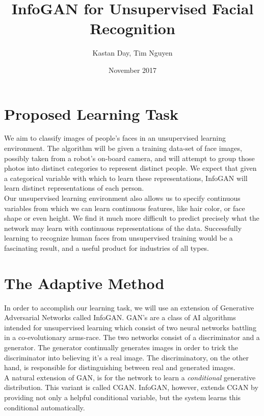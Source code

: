 \documentclass{article}
\title{InfoGAN for Unsupervised Facial Recognition}
\author{Kastan Day, Tim Nguyen}
\date{November 2017}
\begin{document}
\maketitle

\section{Proposed Learning Task}

We aim to classify images of people's faces in an unsupervised learning environment.  The algorithm will be given a training data-set of face images, possibly taken from a robot's on-board camera, and will attempt to group those photos into distinct categories to represent distinct people.  We expect that given a categorical variable with which to learn these representations, InfoGAN will learn distinct representations of each person. \\

Our unsupervised learning environment also allows us to specify continuous variables from which we can learn continuous features, like hair color, or face shape or even height.  We find it much more difficult to predict precisely what the network may learn with continuous representations of the data. Successfully learning to recognize human faces from unsupervised training would be a fascinating result, and a useful product for industries of all types.


\section{The Adaptive Method}
In order to accomplish our learning task, we will use an extension of Generative Adversarial Networks called InfoGAN.  GAN's are a class of AI algorithms intended for unsupervised learning which consist of two neural networks battling in a co-evolutionary arms-race.  The two networks consist of a discriminator and a generator.  The generator continually generates images in order to trick the discriminator into believing it's a real image.  The discriminatory, on the other hand, is responsible for distinguishing between real and generated images. \\  

A natural extension of GAN, is for the network to learn a \textit{conditional} generative distribution.  This variant is called CGAN. InfoGAN, however, extends CGAN by providing not only a helpful conditional variable, but the system learns this conditional automatically.  
\end{document}
